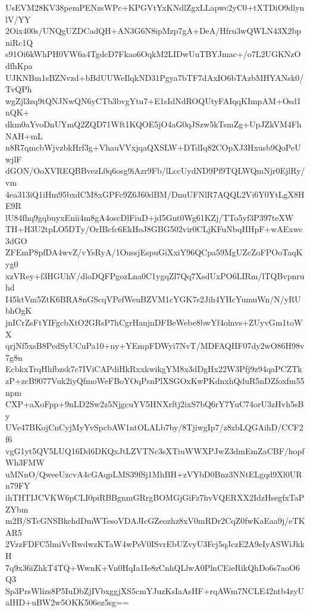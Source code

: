 UsEVM28KV38pemPENzsWPc+KPGVtYxKNdlZgxLLapwc2yC0+tXTDiO9dlynlV/YY
2Oix400s/UNQgUZDCadQH+AN3G6N8ipMzp7gA+DeA/Hfru3wQWLN43X2bpniRc1Q
s91Oi6kWhPH0VW6a4TgdcD7Fkao6OqkM2LIDwUuTBYJmac+/o7L2UGKNzOdfhKpa
UJKNBm1sBZNvzd+bBdUUWeIlqkND31Pgya7bTF7dAxIO6bTAzbMHYANsk0/TvQPh
wgZjl3zq9tQNJNwQN6yCTb3bvgYtu7+E1sIdNdROQUtyFAIqqKImpAM+Osd1nQK+
dkm0aYvoDnUYmQ2ZQD71Wft1KQOE5jO4aG0qJSzw5kTsmZg+UpJZkVM4FhNAH+mL
n8R7qmcbWjvzbkHrf3g+VhauVVxjqaQXSLW+DTdIq82COpXJ3Hxusb9QoPeUwjlF
dGON/OoXVREQBBvezL0q6osg9iAzr9Fb/lLccUydND9Pf9TQLWQmNjr0EjlRy/vm
4ea313iQ1iHm95bxdCM8xGPFc9Z6J60dBM/DnuUFNlR7AQQL2Vi6Y0YtLgX8HE9R
lU84fhq9gqbuyxEnii4m8gA4oscDlFiuD+jd5Gnt0Wg61KZj/TTo5yf3P397teXW
TH+H3U2tpLO5DTy/OrIBcfc6EkHoJ8GBG502vir0CLjKFuNbqHHpF+wAExwc3dGO
ZFEmP8pfDA4wvZ/vYsRyA/1OussjEspuGiXxiY96QCpa59MgUZcZoFPOoTaqKyg0
xzVRey+f3HGUhV/dloDQFPgozLna0C1ygqZl7Qq7XsdUxPO6LIRm/lTQBvpnruhd
I45ktVm5ZtK6BRA8nGScqVPefWeuBZVM1cYGK7s2Jih4YHcYumuWn/N/yRUbhOgK
jnICrZsFtYIFgcbXtO2GRsP7hCgrHanjnDFBeWebe8bwYf4olnvs+ZUyvGm1toWX
qrjNf5xsB8PedSyUCuPa10+ny+YEmpFDWyi7NvT/MDFAQHF07dy2wO86H98v7g8n
EcbkxTrqHhfbzsk7c7IViCAPdiHkRxxkwikgYM8x3dDgHx22W3Pfj9z94qaPCZTk
zP+zcB9077Vuk2iyQfmoWeFBoYOqPsnPlXSGOxKwPKdnxhQduR5nDZfoxfm55npm
CXP+aXoFpp+9nLD2Sw2z5NjgcuYV5HNXrftj2ixS7bQ6rY7YuC74orU3zHvh5sBy
UVe47BKojCnCyjMyYvSpcbAW1ntOLALb7by/8TjiwgIp7/z8zbLQGAihD/CCF2f6
vgG1yt5QV5LUQ16Dd6DKQxJtLZVTNc3sXTiuWWXPJwZ3dmEmZaCBF/hopfWh3FMW
uMNnO/QweeUzcvA4cGAqpLMS39fSj1MhBH+zVYbD0Bnz3NNtELgqd9Xl0URn79FY
ihTHTIJCVKW6pCLI0piRBBgnmGRrgBOMGjGiFz7hvVQERXX2IdzHsegfxTaPZYbm
m2B/STcGNSBkchdDmWTesoVDAJIcGZeozhz8xV0mRDr2CqZ0fwKaEaa9j/eTKAR5
2VzzFDFC5lmiVvRwdwzKTaW4wPeV0ISvrEbUZvyU3Fcj5qJczE2A9eIyASWiJkkH
7q9x36iZhkT4TQ+WwnK+Vn0HqIa1Ie8zCnhQLlwA0PlnCEieRikQhDo6s7aoO6Q3
Sp3PrsWlizs8P5IuDbZjIVbxggjXS5cmYJuzKsIaAsHF+rqAWm7NCLE42ntb4zyU
aIHD+uBW2w5OKK506ez5sg==
